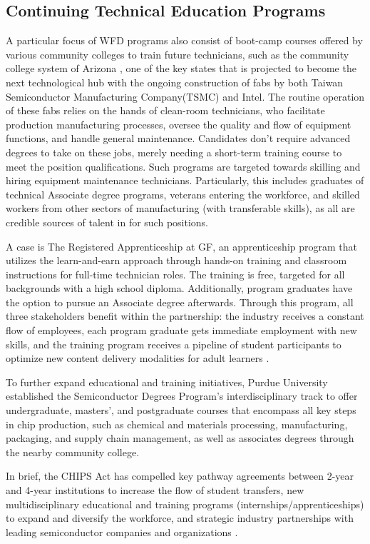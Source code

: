 \subsection{Continuing Technical Education Programs}\label{sec4_2:continue_teched}
A particular focus of WFD programs also consist of boot-camp courses offered by various community colleges to train future technicians, such as the community college system of Arizona \cite{Maricopa_Corporate_College_undated-zr}, one of the key states that is projected to become the next technological hub with the ongoing construction of fabs by both Taiwan Semiconductor Manufacturing Company(TSMC) and Intel. The routine operation of these fabs relies on the hands of clean-room technicians, who facilitate production manufacturing processes, oversee the quality and flow of equipment functions, and handle general maintenance. Candidates don't require advanced degrees to take on these jobs, merely needing a short-term training course to meet the position qualifications. Such programs are targeted towards skilling and hiring equipment maintenance technicians. Particularly, this includes graduates of technical Associate degree programs, veterans entering the workforce, and skilled workers from other sectors of manufacturing (with transferable skills), as all are credible sources of talent in for such positions.

A case is The Registered Apprenticeship at GF, an apprenticeship program that utilizes the learn-and-earn approach through hands-on training and classroom instructions for full-time technician roles. The training is free, targeted for all backgrounds with a high school diploma. Additionally, program graduates have the option to pursue an Associate degree afterwards. Through this program, all three stakeholders benefit within the partnership: the industry receives a constant flow of employees, each program graduate gets immediate employment with new skills, and the training program receives a pipeline of student participants to optimize new content delivery modalities for adult learners \cite{McCaughey2023RegisteredAF}.

To further expand educational and training initiatives, Purdue University established the Semiconductor Degrees Program's interdisciplinary track to offer undergraduate, masters', and postgraduate courses that encompass all key steps in chip production, such as chemical and materials processing, manufacturing, packaging, and supply chain management, as well as associates degrees through the nearby community college. 

In brief, the CHIPS Act has compelled key pathway agreements between 2-year and 4-year institutions to increase the flow of student transfers, new multidisciplinary educational and training programs (internships/apprenticeships) to expand and diversify the workforce, and strategic industry partnerships with leading semiconductor companies and organizations \cite{Weller2023-vi}.  


